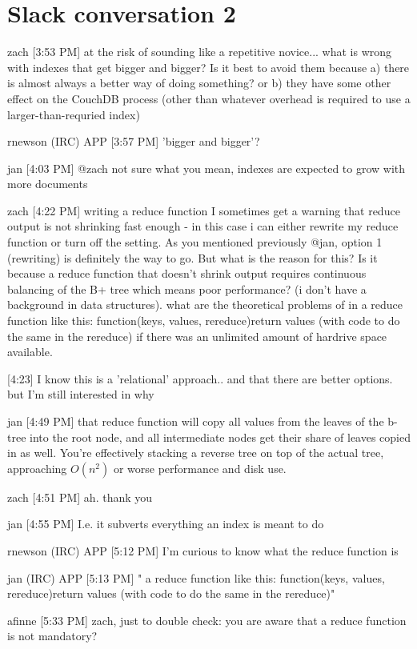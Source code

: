 \section{Slack conversation 2}
\label{appendix:slack2}
zach [3:53 PM]
at the risk of sounding like a repetitive novice... what is wrong with indexes that get bigger and bigger? Is it best to avoid them because a) there is almost always a better way of doing something? or b) they have some other effect on the CouchDB process (other than whatever overhead is required to use a larger-than-requried index)

rnewson (IRC) APP [3:57 PM]
'bigger and bigger'?

jan [4:03 PM]
@zach not sure what you mean, indexes are expected to grow with more documents

zach [4:22 PM]
writing a reduce function I sometimes get a warning that reduce output is not shrinking fast enough - in this case i can either rewrite my reduce function or turn off the setting. As you mentioned previously @jan, option 1 (rewriting) is definitely the way to go. But what is the reason for this? Is it because a reduce function that doesn't shrink output requires continuous balancing of the B+ tree which means poor performance? (i don't have a background in data structures). what are the theoretical problems of in a reduce function like this: function(keys, values, rereduce){return values (with code to do the same in the rereduce)} if there was an unlimited amount of hardrive space available.

[4:23]
I know this is a 'relational' approach.. and that there are better options. but I'm still interested in why

jan [4:49 PM]
that reduce function will copy all values from the leaves of the b-tree into the root node, and all intermediate nodes get their share of leaves copied in as well. You’re effectively stacking a reverse tree on top of the actual tree, approaching $ O(n^2) $ or worse performance and disk use.

zach [4:51 PM]
ah. thank you

jan [4:55 PM]
I.e. it subverts everything an index is meant to do

rnewson (IRC) APP [5:12 PM]
I'm curious to know what the reduce function is

jan (IRC) APP [5:13 PM]
" a reduce function like this: function(keys, values, rereduce){return values (with code to do the same in the rereduce)}"

afinne [5:33 PM]
zach, just to double check: you are aware that a reduce function is not mandatory?

